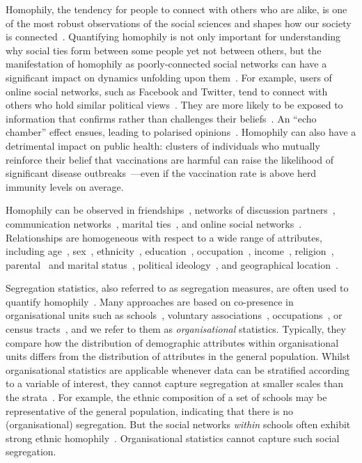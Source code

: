 \documentclass{scrartcl}
\begin{document}
Homophily, the tendency for people to connect with others who are alike, is one of the most robust observations of the social sciences and shapes how our society is connected~\cite{McPherson2001}. Quantifying homophily is not only important for understanding why social ties form between some people yet not between others, but the manifestation of homophily as poorly-connected social networks can have a significant impact on dynamics unfolding upon them~\cite{Golub2012}. For example, users of online social networks, such as Facebook and Twitter, tend to connect with others who hold similar political views~\cite{Boutyline2017}. They are more likely to be exposed to information that confirms rather than challenges their beliefs~\cite{Bakshy2015}. An ``echo chamber'' effect ensues, leading to polarised opinions~\cite{DeMarzo2003}. Homophily can also have a detrimental impact on public health: clusters of individuals who mutually reinforce their belief that vaccinations are harmful can raise the likelihood of significant disease outbreaks~\cite{Salathe2008}---even if the vaccination rate is above herd immunity levels on average.

Homophily can be observed in friendships~\cite{Currarini2009, Hipp2009}, networks of discussion partners~\cite{McPherson2006}, communication networks~\cite{Wang2013, Leo2016}, marital ties~\cite{Blau1984}, and online social networks~\cite{Chang2010}. Relationships are homogeneous with respect to a wide range of attributes, including age~\cite{Marsden1988,Smith2014}, sex~\cite{Stehle2011,Smith2014}, ethnicity~\cite{Chang2010, Blumenstock2013, Currarini2009}, education~\cite{McPherson2006, Smith2014,Johnson1989}, occupation~\cite{Chan2004}, income~\cite{Leo2016, Wang2013, Johnson1989}, religion~\cite{Platt2012}, parental~\cite{Johnson1989} and marital status~\cite{Kalmijn2007}, political ideology~\cite{Bakshy2015, Boutyline2017}, and geographical location~\cite{Lambiotte2008, Expert2011, Backstrom2010, Scellato2011, Illenberger2013}.

Segregation statistics, also referred to as segregation measures, are often used to quantify homophily~\cite{Rodriguez-Moral2016, Bojanowski2014}. Many approaches are based on co-presence in organisational units such as schools~\cite{Orfield2014}, voluntary associations~\cite{Popielarz1999}, occupations~\cite{Charles1995}, or census tracts~\cite{Reardon2004,Reardon2011}, and we refer to them as \emph{organisational} statistics. Typically, they compare how the distribution of demographic attributes within organisational units differs from the distribution of attributes in the general population. Whilst organisational statistics are applicable whenever data can be stratified according to a variable of interest, they cannot capture segregation at smaller scales than the strata~\cite{Blumenstock2013}. For example, the ethnic composition of a set of schools may be representative of the general population, indicating that there is no (organisational) segregation. But the social networks \emph{within} schools often exhibit strong ethnic homophily~\cite{Currarini2009,Moody2001}. Organisational statistics cannot capture such social segregation.
\end{document}
